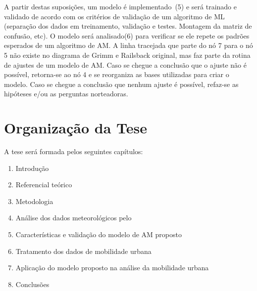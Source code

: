 A partir destas suposições, um modelo é implementado~(5) e será trainado e validado de acordo com os critérios de validação de um algoritmo de ML (separação dos dados em treinamento, validação e testes. Montagem da matriz de confusão, etc). O modelo será analisado(6) para verificar se ele repete os padrões esperados de um algoritmo de AM. A linha tracejada que parte do nó 7 para o nó 5 não existe no diagrama de Grimm e Railsback original, mas faz parte da rotina de ajustes de um modelo de AM. Caso se chegue a conclusão que o ajuste não é possível, retorna-se ao nó 4 e se reorganiza as bases utilizadas para criar o modelo. Caso se chegue a conclusão que nenhum ajuste é possível, refaz-se as hipóteses e/ou as perguntas norteadoras. 


\section{Organização da Tese}
\label{sec:organizacao}

A tese será formada pelos seguintes capítulos:
\begin{enumerate}
	\item Introdução
	\item Referencial teórico
	\item Metodologia
	\item Análise dos dados meteorológicos pelo \dmc
	\item Características e validação do modelo de AM proposto
	\item Tratamento dos dados de mobilidade urbana
	\item Aplicação do modelo proposto na análise da mobilidade urbana
	\item Conclusões
\end{enumerate}
